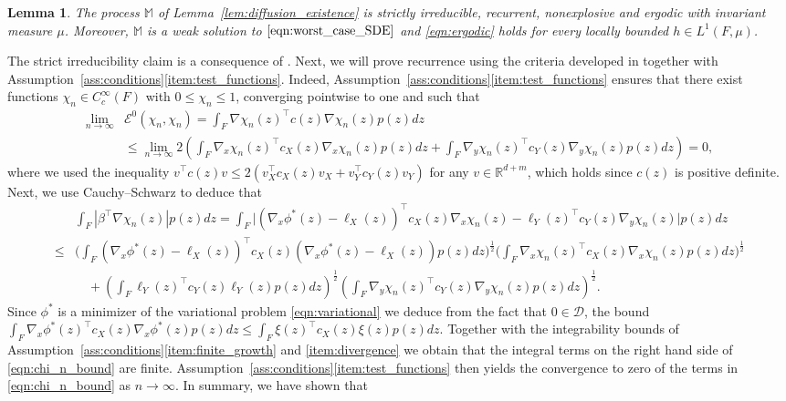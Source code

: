 \documentclass{article}
\makeatletter
\theoremstyle{plain}
\newtheorem{lem}{Lemma}
\theoremstyle{definition}
\newcommand{\R}{\mathbb{R}}
\newcommand{\Dcal}{{\mathcal D}}
\newcommand{\Ecal}{{\mathcal E}}
\numberwithin{lem}{section}
\renewenvironment{proof}[1][\proofname] {\par\pushQED{\qed}\normalfont\topsep6\p@\@plus6\p@\relax\trivlist\item[\hskip\labelsep\bfseries#1\@addpunct{.}]\ignorespaces}{\popQED\endtrivlist\@endpefalse}
\makeatother
\begin{document}
\begin{lem} \label{lem:diffusion_properties}
    The process $\mathbb{M}$ of Lemma~\ref{lem:diffusion_existence} is strictly irreducible, recurrent, nonexplosive and ergodic with invariant measure $\mu$. Moreover, $\mathbb{M}$ is a weak solution to $\eqref{eqn:worst_case_SDE}$ and \eqref{eqn:ergodic} holds for every locally bounded $h \in L^1(F,\mu)$.
\end{lem}
\begin{proof} The strict irreducibility claim is a consequence of \cite[Proposition~2.39]{leeanalytic2022}. Next, we will prove recurrence using the criteria developed in \cite{gim2018recurrence} together with Assumption~\ref{ass:conditions}\ref{item:test_functions}. Indeed, Assumption~\ref{ass:conditions}\ref{item:test_functions} ensures that there exist functions $\chi_n \in C_c^\infty(F)$ with $0 \leq \chi_n \leq 1$, converging pointwise to one and such that
\begin{align} 
\lim_{n \to \infty} &  \Ecal^0(\chi_n,\chi_n) = \int_F \nabla \chi_n(z)^\top c(z)\nabla \chi_n(z)p(z)dz \\
& \leq \lim_{n \to \infty}2\left(\int_F \nabla_x \chi_n(z)^\top c_X(z)\nabla_x\chi_n(z)p(z)dz + \int_F \nabla_y \chi_n(z)^\top c_Y(z)\nabla_y\chi_n(z)p(z)dz\right)  = 0,
\end{align}
where we used the inequality $v^\top c(z) v \leq 2(v_X^\top c_X(z)v_X + v_Y^\top c_Y(z)v_Y)$ for any $v \in \R^{d+m}$, which holds since $c(z)$ is positive definite.
Next, we use Cauchy--Schwarz to deduce that
\begin{align}
     & \int_F|\beta^\top \nabla \chi_n(z)|p(z)dz  = \int_F|(\nabla_x \phi^*(z) - \ell_X(z))^\top c_X(z)\nabla_x \chi_n(z) - \ell_Y(z)^\top c_Y(z) \nabla_y \chi_n(z)\big|p(z)dz \\
      \leq & \bigg(\!\int_F (\nabla_x \phi^*(z)-\ell_X(z))^\top c_X(z)(\nabla_x \phi^*(z) - \ell_X(z))p(z)dz\!\bigg)^{\!\frac{1}{2}}\!\bigg(\!\int_F \nabla_x \chi_n(z)^\top c_X(z)\nabla_x \chi_n(z)p(z)dz\!\bigg)^\frac{1}{2} \\
     & \quad + \left(\int_F \ell_Y(z)^\top c_Y(z)\ell_Y(z)p(z)dz\right)^\frac{1}{2}\left(\int_F\nabla_y \chi_n(z)^\top c_Y(z)\nabla_y \chi_n(z)p(z)dz\right)^\frac{1}{2}. \label{eqn:chi_n_bound}
\end{align}
Since $\phi^*$ is a minimizer of the variational problem \eqref{eqn:variational} we deduce from the fact that $0 \in \Dcal$, the bound $\int_F\nabla_x \phi^*(z)^\top c_X(z)\nabla_x \phi^*(z)p(z)dz \leq \int_F \xi(z)^\top c_X(z)\xi(z)p(z)dz$. Together with the integrability bounds of Assumption~\ref{ass:conditions}\ref{item:finite_growth} and \ref{item:divergence} we obtain that the integral terms on the right hand side of \eqref{eqn:chi_n_bound} are finite. Assumption~\ref{ass:conditions}\ref{item:test_functions} then yields the convergence to zero of the terms in \eqref{eqn:chi_n_bound} as $n \to \infty$. In summary, we have shown that

\end{proof}
\end{document}
